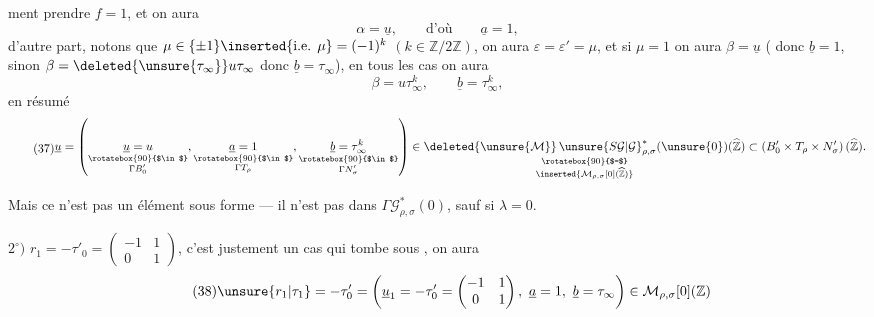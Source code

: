 ment prendre $f=1$, et on aura
\[
\alpha=\underline u,\qquad\text{d'où}\qquad\underline a=1,
\]
d'autre part, notons que $\mu\in\{\pm1\}\inserted{\text{i.e. }\mu}=(-1)^k$ $(k\in\mathbb Z/2\mathbb Z)$, on aura $\varepsilon=\varepsilon'=\mu$, et si $\mu=1$  on aura $\beta=\underline u$ ( donc $\underline b=1$, sinon $\beta=\deleted{\unsure{\tau_\infty}}u\tau_\infty$ donc $\underline b=\tau_\infty$), en tous les cas on aura
\[
\beta=u\tau_\infty^k,\qquad\underline b=\tau_\infty^k,
\]
en résumé
\[
\tag{37}
\begin{gathered}
\underline u=\left(
\underset{\substack{\rotatebox{90}{$\in$}\\\Gamma B'_0}}{\underline u=u},
\underset{\substack{\rotatebox{90}{$\in$}\\\Gamma T_\rho}}{\underline a=1},
\underset{\substack{\rotatebox{90}{$\in$}\\\Gamma N'_\sigma}}{\underline b=\tau_\infty^k}
\right)
\in
\underset{\substack{\rotatebox{90}{$=$}\\\inserted{\mathcal M_{\rho,\sigma}[0](\widehat{\mathbb Z})}}}
{\deleted{\unsure{\mathcal M}}\,\unsure{S\mathcal G|\mathcal G}_{\rho,\sigma}^{*}(\unsure{0})(\widehat{\mathbb Z})}
\subset\left(B'_0\times T_\rho\times N'_\sigma\right)(\widehat{\mathbb Z}).
\end{gathered}
\]


Mais ce n'est pas un élément sous forme   ---   il n'est pas dans $\Gamma\mathcal G_{\rho,\sigma}^{*}(0)$, sauf si $\lambda=0$. 

$2^\circ)$ $r_1=-\tau'_0=\begin{pmatrix}-1&1\\0&1\end{pmatrix}$, c'est justement un cas qui tombe sous , on aura
\[
\tag{38}
\unsure{r_1|\tau_1}=-\tau'_0=
\left(\underline u_1=-\tau'_0=\begin{pmatrix}-1&1\\0&1\end{pmatrix},\ \underline a=1,\ \underline b=\tau_\infty\right)
\in\mathcal M_{\rho,\sigma}[0](\mathbb Z)
\]

